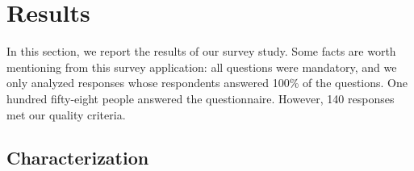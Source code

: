 \documentclass[runningheads]{llncs}
\begin{document}
\section{Results} 
\label{section:results}

In this section, we report the results of our survey study. Some facts are worth mentioning from this survey application: all questions were mandatory, and we only analyzed responses whose respondents answered 100\% of the questions. One hundred fifty-eight people answered the questionnaire. However, 140 responses met our quality criteria. 


\subsection{Characterization}
\label{section:Characterization}
\end{document}
